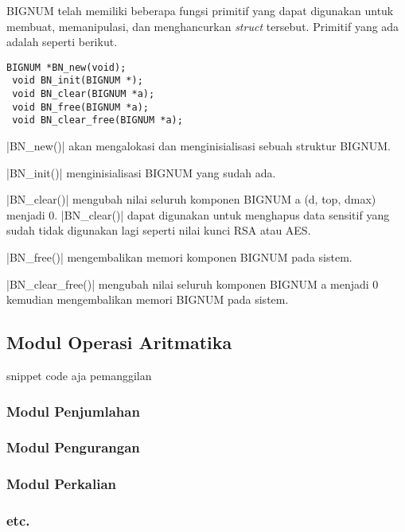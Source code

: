 BIGNUM telah memiliki beberapa fungsi primitif yang dapat digunakan untuk membuat, memanipulasi, dan menghancurkan \textit{struct} tersebut. Primitif yang ada adalah seperti berikut.

\begin{lstlisting}[caption=Primitif BIGNUM]
 BIGNUM *BN_new(void);
 void BN_init(BIGNUM *);
 void BN_clear(BIGNUM *a);
 void BN_free(BIGNUM *a);
 void BN_clear_free(BIGNUM *a);
\end{lstlisting}

|BN_new()| akan mengalokasi dan menginisialisasi sebuah struktur BIGNUM.

|BN_init()| menginisialisasi BIGNUM yang sudah ada.

|BN_clear()| mengubah nilai seluruh komponen BIGNUM a (d, top, dmax) menjadi 0. |BN_clear()| dapat digunakan untuk menghapus data sensitif yang sudah tidak digunakan lagi seperti nilai kunci RSA atau AES.

|BN_free()| mengembalikan memori komponen BIGNUM pada sistem.

|BN_clear_free()| mengubah nilai seluruh komponen BIGNUM a menjadi 0 kemudian mengembalikan memori BIGNUM pada sistem.


\subsection{Modul Operasi Aritmatika}
snippet code aja pemanggilan
\subsubsection{Modul Penjumlahan}
\subsubsection{Modul Pengurangan}
\subsubsection{Modul Perkalian}
\subsubsection{etc.}
